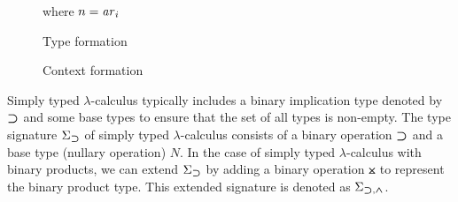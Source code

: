 \documentclass[acmsmall,screen]{acmart}
\theoremstyle{acmdefinition}
\begin{document}
\begin{figure}
  \begin{minipage}[b]{.55\textwidth}
    \centering
    \small
    where $n = \mathit{ar}_i$
    \caption{Type formation}
    \label{fig:simple-type}
  \end{minipage}
  \begin{minipage}[b]{.4\textwidth}
    \centering
    \small
    \caption{Context formation}
  \label{fig:simple-context}
  \end{minipage}
\end{figure}

\begin{example}\label{ex:implication}
  Simply typed $\lambda$-calculus typically includes a binary implication type denoted by $\mathbin{\bm{\supset}}$ and some base types to ensure that the set of all types is non-empty.
  The type signature $\Sigma_{\mathbin{\bm{\supset}}}$ of simply typed $\lambda$-calculus consists of a binary operation $\mathbin{\bm{\supset}}$ and a base type (nullary operation) $N$.
  In the case of simply typed $\lambda$-calculus with binary products, we can extend $\Sigma_{\mathbin{\bm{\supset}}}$ by adding a binary operation $\btimes$ to represent the binary product type.
  This extended signature is denoted as $\Sigma_{\mathbin{\bm{\supset}}, \mathbin{\bm{\wedge}}}$.
\end{example}
\end{document}
